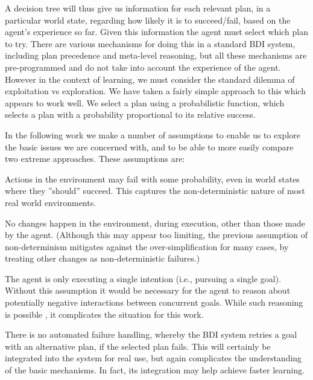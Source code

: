 A decision tree will thus give us information for each relevant 
plan, in a particular world state, regarding how likely it
is to succeed/fail, based on the agent's experience so far. Given this
information the agent must select which plan to try. There are various
mechanisms for doing this in a standard BDI system, including plan
precedence and meta-level reasoning, 
but all these mechanisms are pre-programmed and do not take into
account the experience of the agent.
However in the context of learning, we must consider the standard
dilemma of exploitation vs exploration.  We have taken a fairly simple
approach to this which appears to work well. We
select a plan using a probabilistic function, which selects a plan
with a probability proportional to its relative success.

In the following work we make a number of assumptions to enable us to
explore the basic issues we are concerned with, and to be able to more
easily compare two extreme approaches. These assumptions are:
\begin{tightenumerate}
\item
Actions in the environment may fail with some probability, even in
world states where they ''should'' succeed. 
This captures the non-deterministic nature of most real
world environments. 
\item
No changes happen in the environment, during execution, other than
those made by the agent. (Although this may appear too
limiting, the previous assumption of non-determinism mitigates against
the over-simplification for many cases, by treating other changes as
non-deterministic failures.)
\item
The agent is only executing a single intention (i.e., pursuing a single
goal). 
%
Without this assumption it would be necessary for the agent to
reason about potentially negative interactions between concurrent goals. While such reasoning is
possible
\cite{Thangarajah02}, it complicates the situation for this work.

\item
There is no automated failure handling, whereby the BDI system retries
a goal with an alternative plan, if the selected plan fails. This will
certainly be integrated into the system for real use, but again
complicates the understanding of the basic mechanisms. In fact,
its integration may help achieve faster learning.
\end{tightenumerate}



